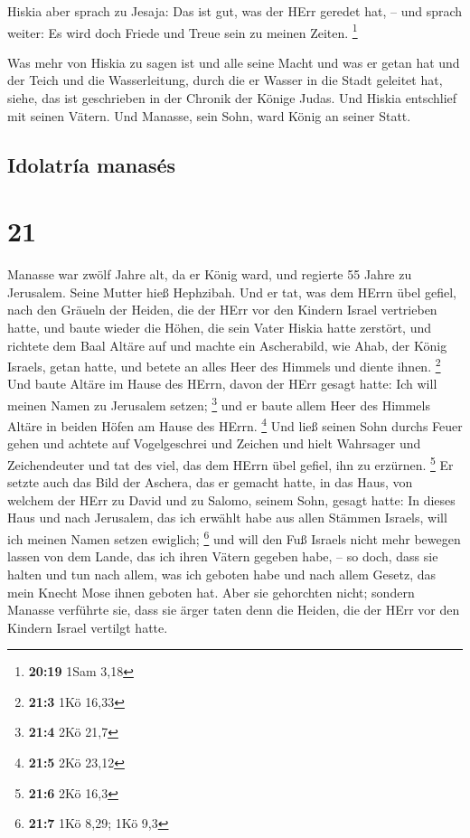  Hiskia aber sprach zu Jesaja: Das ist gut, was der HErr
geredet hat, -- und sprach weiter: Es wird doch Friede und Treue sein zu
meinen Zeiten. \footnote{\textbf{20:19} 1Sam 3,18}

 Was mehr von Hiskia zu sagen ist und alle seine Macht
und was er getan hat und der Teich und die Wasserleitung, durch die er
Wasser in die Stadt geleitet hat, siehe, das ist geschrieben in der
Chronik der Könige Judas.  Und Hiskia entschlief mit
seinen Vätern. Und Manasse, sein Sohn, ward König an seiner Statt.

\hypertarget{idolatruxeda-manasuxe9s}{%
\subsection{Idolatría manasés}\label{idolatruxeda-manasuxe9s}}

\hypertarget{section-20}{%
\section{21}\label{section-20}}

 Manasse war zwölf Jahre alt, da er König ward, und
regierte 55 Jahre zu Jerusalem. Seine Mutter hieß Hephzibah.
 Und er tat, was dem HErrn übel gefiel, nach den Gräueln
der Heiden, die der HErr vor den Kindern Israel vertrieben hatte,
 und baute wieder die Höhen, die sein Vater Hiskia hatte
zerstört, und richtete dem Baal Altäre auf und machte ein Ascherabild,
wie Ahab, der König Israels, getan hatte, und betete an alles Heer des
Himmels und diente ihnen. \footnote{\textbf{21:3} 1Kö 16,33}
 Und baute Altäre im Hause des HErrn, davon der HErr
gesagt hatte: Ich will meinen Namen zu Jerusalem setzen; \footnote{\textbf{21:4}
  2Kö 21,7}  und er baute allem Heer des Himmels Altäre in
beiden Höfen am Hause des HErrn. \footnote{\textbf{21:5} 2Kö 23,12}
 Und ließ seinen Sohn durchs Feuer gehen und achtete auf
Vogelgeschrei und Zeichen und hielt Wahrsager und Zeichendeuter und tat
des viel, das dem HErrn übel gefiel, ihn zu erzürnen. \footnote{\textbf{21:6}
  2Kö 16,3}  Er setzte auch das Bild der Aschera, das er
gemacht hatte, in das Haus, von welchem der HErr zu David und zu Salomo,
seinem Sohn, gesagt hatte: In dieses Haus und nach Jerusalem, das ich
erwählt habe aus allen Stämmen Israels, will ich meinen Namen setzen
ewiglich; \footnote{\textbf{21:7} 1Kö 8,29; 1Kö 9,3}  und
will den Fuß Israels nicht mehr bewegen lassen von dem Lande, das ich
ihren Vätern gegeben habe, -- so doch, dass sie halten und tun nach
allem, was ich geboten habe und nach allem Gesetz, das mein Knecht Mose
ihnen geboten hat.  Aber sie gehorchten nicht; sondern
Manasse verführte sie, dass sie ärger taten denn die Heiden, die der
HErr vor den Kindern Israel vertilgt hatte.

